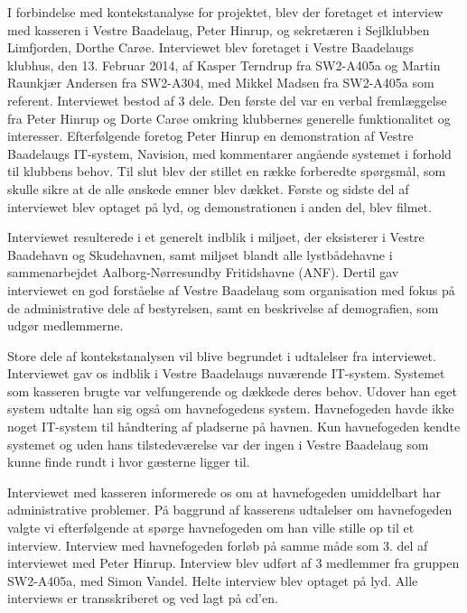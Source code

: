 
I forbindelse med kontekstanalyse for projektet, blev der foretaget et interview med kasseren i Vestre Baadelaug, Peter Hinrup, og sekretæren i Sejlklubben Limfjorden, Dorthe Carøe. Interviewet blev foretaget i Vestre Baadelaugs klubhus, den 13. Februar 2014, af Kasper Terndrup fra SW2-A405a og Martin Raunkjær Andersen fra SW2-A304, med Mikkel Madsen fra SW2-A405a som referent. Interviewet bestod af 3 dele. Den første del var en verbal fremlæggelse fra Peter Hinrup og Dorte Carøe omkring klubbernes generelle funktionalitet og interesser. Efterfølgende foretog Peter Hinrup en demonstration af Vestre Baadelaugs IT-system, Navision, med kommentarer angående systemet i forhold til klubbens behov. Til slut blev der stillet en række forberedte spørgsmål, som skulle sikre at de alle ønskede emner blev dækket. Første og sidste del af interviewet blev optaget på lyd, og demonstrationen i anden del, blev filmet.

Interviewet resulterede i et generelt indblik i miljøet, der eksisterer i Vestre Baadehavn og Skudehavnen, samt miljøet blandt alle lystbådehavne i sammenarbejdet Aalborg-Nørresundby Fritidshavne (ANF). Dertil gav interviewet en god forståelse af Vestre Baadelaug som organisation med fokus på de administrative dele af bestyrelsen, samt en beskrivelse af demografien, som udgør medlemmerne.

Store dele af kontekstanalysen vil blive begrundet i udtalelser fra interviewet. Interviewet gav os indblik i Vestre Baadelaugs nuværende IT-system. Systemet som kasseren brugte var velfungerende og dækkede deres behov. Udover han eget system udtalte han sig også om havnefogedens system. Havnefogeden havde ikke noget IT-system til håndtering af pladserne på havnen. Kun havnefogeden kendte systemet og uden hans tilstedeværelse var der ingen i Vestre Baadelaug som kunne finde rundt i hvor gæsterne ligger til. 

Interviewet med kasseren informerede os om at havnefogeden umiddelbart har administrative problemer. På baggrund af kasserens udtalelser om havnefogeden valgte vi efterfølgende at spørge havnefogeden om han ville stille op til et interview.
Interview med havnefogeden forløb på samme måde som 3. del af interviewet med Peter Hinrup. Interview blev udført af 3 medlemmer fra gruppen SW2-A405a, med Simon Vandel. Helte interview blev optaget på lyd. Alle interviews er transskriberet og ved lagt på cd'en. 

